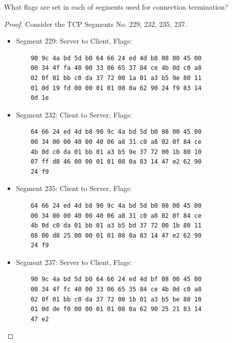 \documentclass[../main.tex]{subfiles}
\begin{document}
\begin{wts}
	What flags are set in each of segments used for connection termination?
\end{wts}
\begin{proof}
Consider the TCP Segments No. 229, 232, 235, 237.
\begin{itemize}
    \item Segment 229: Server to Client, Flags: 
    \begin{lstlisting}
    90 9c 4a bd 5d b0 64 66 24 ed 4d b8 08 00 45 00
    00 34 4f fa 40 00 33 06 65 37 84 ce 4b 0d c0 a8
    02 0f 01 bb c0 da 37 72 00 1a 01 a3 b5 9e 80 11
    01 0d 19 fd 00 00 01 01 08 0a 62 90 24 f9 83 14
    0d 1e\end{lstlisting}
    
    \item Segment 232: Client to Server, Flags: 
    \begin{lstlisting}
    64 66 24 ed 4d b8 90 9c 4a bd 5d b0 08 00 45 00
    00 34 00 00 40 00 40 06 a8 31 c0 a8 02 0f 84 ce
    4b 0d c0 da 01 bb 01 a3 b5 9e 37 72 00 1b 80 10
    07 ff d8 46 00 00 01 01 08 0a 83 14 47 e2 62 90
    24 f9\end{lstlisting}
    
    \item Segment 235: Client to Server, Flags: 
    \begin{lstlisting}
    64 66 24 ed 4d b8 90 9c 4a bd 5d b0 08 00 45 00
    00 34 00 00 40 00 40 06 a8 31 c0 a8 02 0f 84 ce
    4b 0d c0 da 01 bb 01 a3 b5 bd 37 72 00 1b 80 11
    08 00 d8 25 00 00 01 01 08 0a 83 14 47 e2 62 90
    24 f9\end{lstlisting}
    
    \item Segment 237: Server to Client, Flags: 
    \begin{lstlisting}
    90 9c 4a bd 5d b0 64 66 24 ed 4d bf 08 00 45 00
    00 34 4f fc 40 00 33 06 65 35 84 ce 4b 0d c0 a8
    02 0f 01 bb c0 da 37 72 00 1b 01 a3 b5 be 80 10
    01 0d de f0 00 00 01 01 08 0a 62 90 25 21 83 14
    47 e2\end{lstlisting}
\end{itemize}
\end{proof}
\newpage
\end{document}
